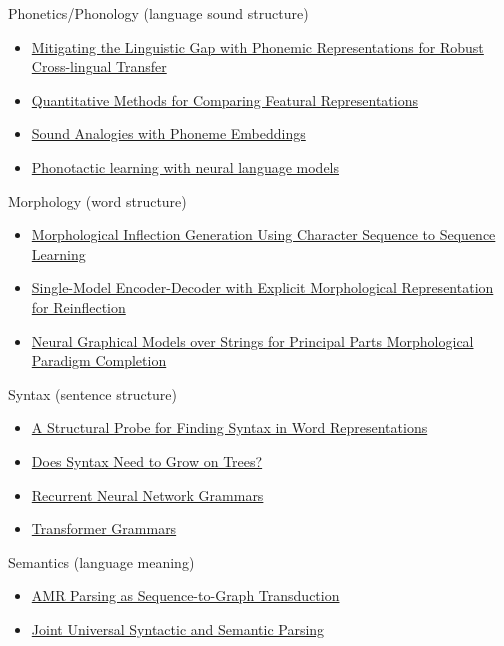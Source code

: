 \documentclass[11pt]{article}
\begin{document}
Phonetics/Phonology (language sound structure)
\begin{itemize}
  \item \href{https://aclanthology.org/2024.mrl-1.16/}{Mitigating the Linguistic Gap with Phonemic Representations for Robust Cross-lingual Transfer}
  \item \href{http://individual.utoronto.ca/ewan_dunbar/pdfs/dunbar_synnaeve_dupoux_icphs_2015.pdf}{Quantitative Methods for Comparing Featural Representations}
  \item \href{https://openpublishing.library.umass.edu/scil/article/id/1080/}{Sound Analogies with Phoneme Embeddings}
  \item \href{https://aclanthology.org/2020.scil-1.36/}{Phonotactic learning with neural language models}
\end{itemize}

Morphology (word structure)
\begin{itemize}
  \item \href{https://aclanthology.org/N16-1077/}{Morphological Inflection Generation Using Character Sequence to Sequence Learning}
  \item \href{https://aclanthology.org/P16-2090/}{Single-Model Encoder-Decoder with Explicit Morphological Representation for Reinflection}
  \item \href{https://aclanthology.org/E17-2120/}{Neural Graphical Models over Strings for Principal Parts Morphological Paradigm Completion}
\end{itemize}

Syntax (sentence structure)
\begin{itemize}
  \item \href{https://aclanthology.org/N19-1419/}{A Structural Probe for Finding Syntax in Word Representations}
  \item \href{https://direct.mit.edu/tacl/article/doi/10.1162/tacl_a_00304/43542/Does-Syntax-Need-to-Grow-on-Trees-Sources-of}{Does Syntax Need to Grow on Trees?}
  \item \href{https://aclanthology.org/N16-1024/}{Recurrent Neural Network Grammars}
  \item \href{https://direct.mit.edu/tacl/article/doi/10.1162/tacl_a_00526/114315/Transformer-Grammars-Augmenting-Transformer}{Transformer Grammars}
\end{itemize}

Semantics (language meaning)
\begin{itemize}
  \item \href{https://aclanthology.org/P19-1009/}{AMR Parsing as Sequence-to-Graph Transduction}
  \item \href{https://direct.mit.edu/tacl/article/doi/10.1162/tacl_a_00396/106796/Joint-Universal-Syntactic-and-Semantic-Parsing}{Joint Universal Syntactic and Semantic Parsing}
\end{itemize}
\end{document}
